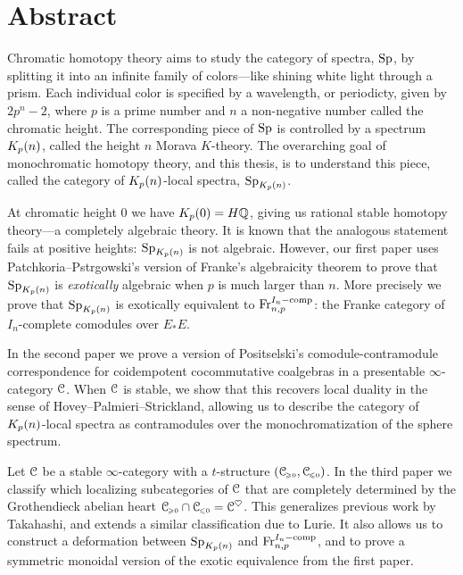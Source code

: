 

\section*{Abstract}

Chromatic homotopy theory aims to study the category of spectra, $\mathrm{Sp}$, by splitting it into an infinite family of colors---like shining white light through a prism. Each individual color is specified by a wavelength, or periodicty, given by $2p^n-2$, where $p$ is a prime number and $n$ a non-negative number called the chromatic height. The corresponding piece of $\mathrm{Sp}$ is controlled by a spectrum ${K_p(n)}$, called the height $n$ Morava $K$-theory. The overarching goal of monochromatic homotopy theory, and this thesis, is to understand this piece, called the category of ${K_p(n)}$-local spectra, $\mathrm{Sp}_{K_p(n)}$. 

At chromatic height $0$ we have $K_p(0) = H\mathbb{Q}$, giving us rational stable homotopy theory---a completely algebraic theory. It is known that the analogous statement fails at positive heights: $\mathrm{Sp}_{K_p(n)}$ is not algebraic. However, our first paper uses Patchkoria--Pstr\a{}gowski's version of Franke's algebraicity theorem to prove that $\mathrm{Sp}_{K_p(n)}$ is \emph{exotically} algebraic when $p$ is much larger than $n$. More precisely we prove that $\mathrm{Sp}_{K_p(n)}$ is exotically equivalent to $\mathrm{Fr}_{n,p}^{I_n-\mathrm{comp}}$: the Franke category of $I_n$-complete comodules over $E_*E$. 

In the second paper we prove a version of Positselski's comodule-contramodule correspondence for coidempotent cocommutative coalgebras in a presentable $\infty$-category $\EuScript{C}$. When $\EuScript{C}$ is stable, we show that this recovers local duality in the sense of Hovey--Palmieri--Strickland, allowing us to describe the category of ${K_p(n)}$-local spectra as contramodules over the monochromatization of the sphere spectrum. 

Let $\EuScript{C}$ be a stable $\infty$-category with a $t$-structure $(\EuScript{C}_{\hspace{-1pt}\scriptscriptstyle\geqslant 0}, \EuScript{C}_{\hspace{-1pt}\scriptscriptstyle\leqslant 0})$. In the third paper we classify which localizing subcategories of $\EuScript{C}$ that are completely determined by the Grothendieck abelian heart $\EuScript{C}_{\hspace{-1pt}\scriptscriptstyle\geqslant 0} \cap \EuScript{C}_{\hspace{-1pt}\scriptscriptstyle\leqslant 0} = \EuScript{C}^\heartsuit$. This generalizes previous work by Takahashi, and extends a similar classification due to Lurie. It also allows us to construct a deformation between $\mathrm{Sp}_{K_p(n)}$ and $\mathrm{Fr}_{n,p}^{I_n-\mathrm{comp}}$, and to prove a symmetric monoidal version of the exotic equivalence from the first paper. 




